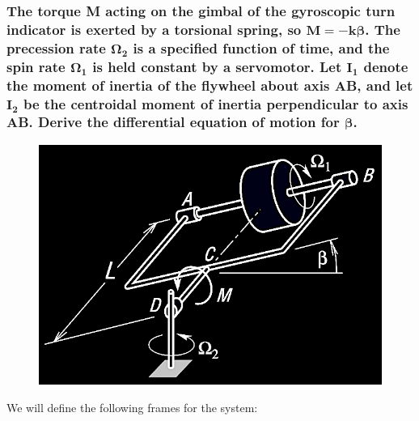 \documentclass[12pt, letterpaper]{../assignment}
\begin{document}
\subsubsection*{The torque M acting on the gimbal of the gyroscopic turn indicator is exerted by a torsional spring, so $\bm{M = -k\beta}$.
The precession rate $\bm{\Omega_2}$ is a specified function of time,
and the spin rate $\bm{\Omega_1}$ is held constant by a servomotor.
Let $\bm{I_1}$ denote the moment of inertia of the flywheel about axis AB,
and let $\bm{I_2}$ be the centroidal moment of inertia perpendicular to axis AB.
Derive the differential equation of motion for $\bm{\beta}$.}

\begin{figure}[H]
    \centering
    \includegraphics[scale=0.7,frame]{images/Q6_8.png}
\end{figure}

We will define the following frames for the system:
\end{document}
